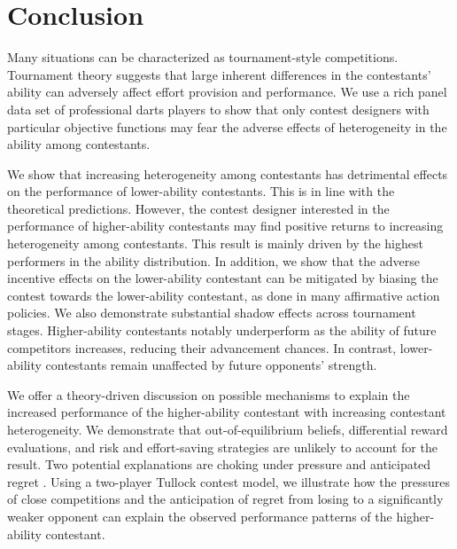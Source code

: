 \documentclass[11pt,a4paper]{article}
\let\Oldsection\section
\renewcommand{\section}{\FloatBarrier\Oldsection}
\begin{document}
\section{Conclusion}\label{sec:conc}

Many situations can be characterized as tournament-style competitions. Tournament theory suggests that large inherent differences in the contestants' ability can adversely affect effort provision and performance. We use a rich panel data set of professional darts players to show that only contest designers with particular objective functions may fear the adverse effects of heterogeneity in the ability among contestants. \par 

We show that increasing heterogeneity among contestants has detrimental effects on the performance of lower-ability contestants. This is in line with the theoretical predictions. However, the contest designer interested in the performance of higher-ability contestants may find positive returns to increasing heterogeneity among contestants. This result is mainly driven by the highest performers in the ability distribution. In addition, we show that the adverse incentive effects on the lower-ability contestant can be mitigated by biasing the contest towards the lower-ability contestant, as done in many affirmative action policies. We also demonstrate substantial shadow effects across tournament stages. Higher-ability contestants notably underperform as the ability of future competitors increases, reducing their advancement chances. In contrast, lower-ability contestants remain unaffected by future opponents' strength.\par 

We offer a theory-driven discussion on possible mechanisms to explain the increased performance of the higher-ability contestant with increasing contestant heterogeneity. We demonstrate that out-of-equilibrium beliefs, differential reward evaluations, and risk and effort-saving strategies are unlikely to account for the result. Two potential explanations are choking under pressure \cite{Baumeister.1984} and anticipated regret \cite{Hyndman.2012}. Using a two-player Tullock contest model, we illustrate how the pressures of close competitions and the anticipation of regret from losing to a significantly weaker opponent can explain the observed performance patterns of the higher-ability contestant.\par
\end{document}
